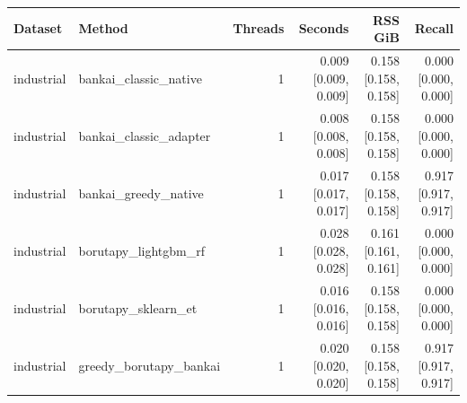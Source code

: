 \begin{tabular}{llrrrr}
Dataset & Method & Threads & Seconds & RSS GiB & Recall \\
\hline
industrial & bankai\_classic\_native & 1 & 0.009 [0.009, 0.009] & 0.158 [0.158, 0.158] & 0.000 [0.000, 0.000] \\
industrial & bankai\_classic\_adapter & 1 & 0.008 [0.008, 0.008] & 0.158 [0.158, 0.158] & 0.000 [0.000, 0.000] \\
industrial & bankai\_greedy\_native & 1 & 0.017 [0.017, 0.017] & 0.158 [0.158, 0.158] & 0.917 [0.917, 0.917] \\
industrial & borutapy\_lightgbm\_rf & 1 & 0.028 [0.028, 0.028] & 0.161 [0.161, 0.161] & 0.000 [0.000, 0.000] \\
industrial & borutapy\_sklearn\_et & 1 & 0.016 [0.016, 0.016] & 0.158 [0.158, 0.158] & 0.000 [0.000, 0.000] \\
industrial & greedy\_borutapy\_bankai & 1 & 0.020 [0.020, 0.020] & 0.158 [0.158, 0.158] & 0.917 [0.917, 0.917] \\
\end{tabular}
